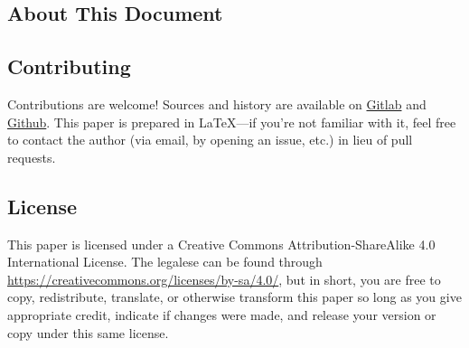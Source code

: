 \documentclass[fontsize=10pt, numbers=endperiod]{scrartcl}
\begin{document}
\begin{center}
\begin{minipage}{0.7\linewidth}
\section{About This Document}

\subsection{Contributing}

Contributions are welcome!
Sources and history are available on
\href{https://gitlab.com/mrkline/lockless-concurrency}{Gitlab}
and
\href{https://github.com/mrkline/lockless-concurrency}{Github}.
This paper is prepared in \LaTeX{}---if you're not familiar with it,
feel free to contact the author
(via email, by opening an issue, etc.)
in lieu of pull requests.

\subsection{License}

This paper is licensed under a
Creative Commons Attribution-ShareAlike 4.0 International License.
The legalese can be found through
\url{https://creativecommons.org/licenses/by-sa/4.0/},
but in short,
you are free to copy, redistribute, translate, or otherwise transform this paper
so long as you give appropriate credit, indicate if changes were made,
and release your version or copy under this same license.

\end{minipage}
\end{center}
\end{document}
